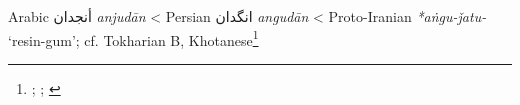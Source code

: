 \begin{etymology}\label{ety:anjudan}
Arabic {أنجدان} \textit{anjudān}
< Persian {انگدان} \textit{angudān}
< Proto-Iranian \textit{*aṅgu-ǰatu-} `resin-gum'; cf. Tokharian B, Khotanese\footnote{\textcite[79-80]{lane_arabic-english_1863}; \textcite[114, 106]{steingass_comprehensive_1892}; \textcite[7]{adams_dictionary_2013}}
\end{etymology}